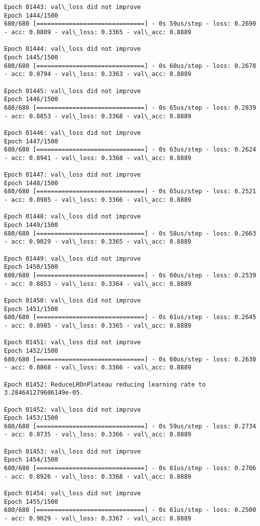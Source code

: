 \documentclass[11pt]{article}
\begin{document}
\begin{Verbatim}[commandchars=\\\{\}]
Epoch 01443: val\_loss did not improve
Epoch 1444/1500
680/680 [==============================] - 0s 59us/step - loss: 0.2690 - acc: 0.8809 - val\_loss: 0.3365 - val\_acc: 0.8889

Epoch 01444: val\_loss did not improve
Epoch 1445/1500
680/680 [==============================] - 0s 60us/step - loss: 0.2678 - acc: 0.8794 - val\_loss: 0.3363 - val\_acc: 0.8889

Epoch 01445: val\_loss did not improve
Epoch 1446/1500
680/680 [==============================] - 0s 65us/step - loss: 0.2839 - acc: 0.8853 - val\_loss: 0.3368 - val\_acc: 0.8889

Epoch 01446: val\_loss did not improve
Epoch 1447/1500
680/680 [==============================] - 0s 63us/step - loss: 0.2624 - acc: 0.8941 - val\_loss: 0.3368 - val\_acc: 0.8889

Epoch 01447: val\_loss did not improve
Epoch 1448/1500
680/680 [==============================] - 0s 65us/step - loss: 0.2521 - acc: 0.8985 - val\_loss: 0.3366 - val\_acc: 0.8889

Epoch 01448: val\_loss did not improve
Epoch 1449/1500
680/680 [==============================] - 0s 58us/step - loss: 0.2663 - acc: 0.9029 - val\_loss: 0.3365 - val\_acc: 0.8889

Epoch 01449: val\_loss did not improve
Epoch 1450/1500
680/680 [==============================] - 0s 60us/step - loss: 0.2539 - acc: 0.8853 - val\_loss: 0.3364 - val\_acc: 0.8889

Epoch 01450: val\_loss did not improve
Epoch 1451/1500
680/680 [==============================] - 0s 61us/step - loss: 0.2645 - acc: 0.8985 - val\_loss: 0.3365 - val\_acc: 0.8889

Epoch 01451: val\_loss did not improve
Epoch 1452/1500
680/680 [==============================] - 0s 60us/step - loss: 0.2630 - acc: 0.8868 - val\_loss: 0.3366 - val\_acc: 0.8889

Epoch 01452: ReduceLROnPlateau reducing learning rate to 3.284641279606149e-05.

Epoch 01452: val\_loss did not improve
Epoch 1453/1500
680/680 [==============================] - 0s 59us/step - loss: 0.2734 - acc: 0.8735 - val\_loss: 0.3366 - val\_acc: 0.8889

Epoch 01453: val\_loss did not improve
Epoch 1454/1500
680/680 [==============================] - 0s 61us/step - loss: 0.2706 - acc: 0.8926 - val\_loss: 0.3368 - val\_acc: 0.8889

Epoch 01454: val\_loss did not improve
Epoch 1455/1500
680/680 [==============================] - 0s 61us/step - loss: 0.2500 - acc: 0.9029 - val\_loss: 0.3367 - val\_acc: 0.8889


\end{Verbatim}
\end{document}
